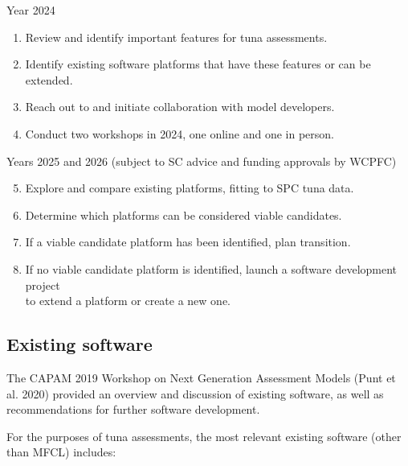 \documentclass{SCreport}
\begin{document}
Year 2024

\begin{enumerate}
  \item Review and identify important features for tuna assessments.\\[-4.5ex]
  \item Identify existing software platforms that have these features or can be
  extended.\\[-4.5ex]
  \item Reach out to and initiate collaboration with model developers.\\[-4.5ex]
  \item Conduct two workshops in 2024, one online and one in person.\\
\end{enumerate}

Years 2025 and 2026 (subject to SC advice and funding approvals by WCPFC)

\begin{enumerate}\setcounter{enumi}{4}
  \item Explore and compare existing platforms, fitting to SPC tuna
  data.\\[-4.5ex]
  \item Determine which platforms can be considered viable candidates.\\[-4.5ex]
  \item If a viable candidate platform has been identified, plan
  transition.\\[-4.5ex]
  \item If no viable candidate platform is identified, launch a software
  development project\\
  to extend a platform or create a new one.
\end{enumerate}

\newpage

\subsection{Existing software}

The CAPAM 2019 Workshop on Next Generation Assessment Models (Punt et al. 2020)
provided an overview and discussion of existing software, as well as
recommendations for further software development.

For the purposes of tuna assessments, the most relevant existing software (other
than MFCL) includes:
\end{document}

